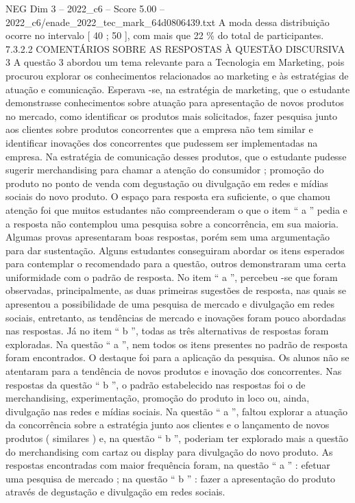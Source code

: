 \begin{textsample}{NEG Dim 3 – 2022\_c6 – Score 5.00 – 2022\_c6/enade\_2022\_tec\_mark\_64d0806439.txt}
A moda dessa distribuição ocorre no intervalo [ 40 ; 50 ], com mais que 22 \% do total de participantes. 7.3.2.2 COMENTÁRIOS SOBRE AS RESPOSTAS À QUESTÃO DISCURSIVA 3 A questão 3 abordou um tema relevante para a Tecnologia em Marketing, pois procurou explorar os conhecimentos relacionados ao marketing e às estratégias de atuação e comunicação.
Esperava -se, na estratégia de marketing, que o estudante demonstrasse conhecimentos sobre atuação para apresentação de novos produtos no mercado, como identificar os produtos mais solicitados, fazer pesquisa junto aos clientes sobre produtos concorrentes que a empresa não tem similar e identificar inovações dos concorrentes que pudessem ser implementadas na empresa.
Na estratégia de comunicação desses produtos, que o estudante pudesse sugerir merchandising para chamar a atenção do consumidor ; promoção do produto no ponto de venda com degustação ou divulgação em redes e mídias sociais do novo produto.
O espaço para resposta era suficiente, o que chamou atenção foi que muitos estudantes não compreenderam o que o item “ a ” pedia e a resposta não contemplou uma pesquisa sobre a concorrência, em sua maioria.
Algumas provas apresentaram boas respostas, porém sem uma argumentação para dar sustentação.
Alguns estudantes conseguiram abordar os itens esperados para contemplar o recomendado para a questão, outros demonstraram uma certa uniformidade com o padrão de resposta.
No item “ a ”, percebeu -se que foram observadas, principalmente, as duas primeiras sugestões de resposta, nas quais se apresentou a possibilidade de uma pesquisa de mercado e divulgação em redes sociais, entretanto, as tendências de mercado e inovações foram pouco abordadas nas respostas.
Já no item “ b ”, todas as três alternativas de respostas foram exploradas.
Na questão “ a ”, nem todos os itens presentes no padrão de resposta foram encontrados.
O destaque foi para a aplicação da pesquisa.
Os alunos não se atentaram para a tendência de novos produtos e inovação dos concorrentes.
Nas respostas da questão “ b ”, o padrão estabelecido nas respostas foi o de merchandising, experimentação, promoção do produto in loco ou, ainda, divulgação nas redes e mídias sociais.
Na questão “ a ”, faltou explorar a atuação da concorrência sobre a estratégia junto aos clientes e o lançamento de novos produtos ( similares ) e, na questão “ b ”, poderiam ter explorado mais a questão do merchandising com cartaz ou display para divulgação do novo produto.
As respostas encontradas com maior frequência foram, na questão “ a ” : efetuar uma pesquisa de mercado ; na questão “ b ” : fazer a apresentação do produto através de degustação e divulgação em redes sociais.

\end{textsample}
